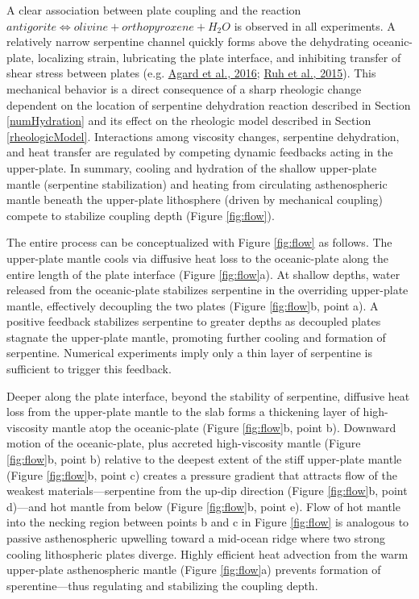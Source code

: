 A clear association between plate coupling and the reaction \(antigorite \allowbreak \Leftrightarrow olivine + orthopyroxene + H_{2}O\) is observed in all experiments. A relatively narrow serpentine channel quickly forms above the dehydrating oceanic-plate, localizing strain, lubricating the plate interface, and inhibiting transfer of shear stress between plates (e.g. \protect\hyperlink{ref-agard2016}{Agard et al., 2016}; \protect\hyperlink{ref-ruh2015}{Ruh et al., 2015}). This mechanical behavior is a direct consequence of a sharp rheologic change dependent on the location of serpentine dehydration reaction described in Section \ref{numHydration} and its effect on the rheologic model described in Section \ref{rheologicModel}. Interactions among viscosity changes, serpentine dehydration, and heat transfer are regulated by competing dynamic feedbacks acting in the upper-plate. In summary, cooling and hydration of the shallow upper-plate mantle (serpentine stabilization) and heating from circulating asthenospheric mantle beneath the upper-plate lithosphere (driven by mechanical coupling) compete to stabilize coupling depth (Figure \ref{fig:flow}).

The entire process can be conceptualized with Figure \ref{fig:flow} as follows. The upper-plate mantle cools via diffusive heat loss to the oceanic-plate along the entire length of the plate interface (Figure \ref{fig:flow}a). At shallow depths, water released from the oceanic-plate stabilizes serpentine in the overriding upper-plate mantle, effectively decoupling the two plates (Figure \ref{fig:flow}b, point a). A positive feedback stabilizes serpentine to greater depths as decoupled plates stagnate the upper-plate mantle, promoting further cooling and formation of serpentine. Numerical experiments imply only a thin layer of serpentine is sufficient to trigger this feedback.

Deeper along the plate interface, beyond the stability of serpentine, diffusive heat loss from the upper-plate mantle to the slab forms a thickening layer of high-viscosity mantle atop the oceanic-plate (Figure \ref{fig:flow}b, point b). Downward motion of the oceanic-plate, plus accreted high-viscosity mantle (Figure \ref{fig:flow}b, point b) relative to the deepest extent of the stiff upper-plate mantle (Figure \ref{fig:flow}b, point c) creates a pressure gradient that attracts flow of the weakest materials---serpentine from the up-dip direction (Figure \ref{fig:flow}b, point d)---and hot mantle from below (Figure \ref{fig:flow}b, point e). Flow of hot mantle into the necking region between points b and c in Figure \ref{fig:flow} is analogous to passive asthenospheric upwelling toward a mid-ocean ridge where two strong cooling lithospheric plates diverge. Highly efficient heat advection from the warm upper-plate asthenospheric mantle (Figure \ref{fig:flow}a) prevents formation of sperentine---thus regulating and stabilizing the coupling depth.

